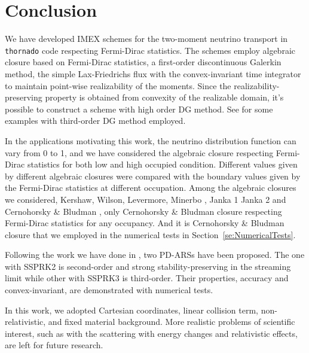 \section{Conclusion}\label{se:Conclusion}

We have developed IMEX schemes for the two-moment neutrino transport in \texttt{thornado} code respecting Fermi-Dirac statistics.
The schemes employ algebraic closure based on Fermi-Dirac statistics, a first-order discontinuous Galerkin method, the simple Lax-Friedrichs flux with the convex-invariant time integrator to maintain point-wise realizability of the moments.
Since the realizability-preserving property is obtained from convexity of the realizable domain, it's possible to construct a scheme with high order DG method.
See \cite{chu_etal_2018} for some examples with third-order DG method employed.

In the applications motivating this work, the neutrino distribution function can vary from 0 to 1, and we have considered the algebraic closure respecting Fermi-Dirac statistics for both low and high occupied condition.
Different values given by different algebraic closures were compared with the boundary values given by the Fermi-Dirac statistics at different occupation.
Among the algebraic closures we considered, Kershaw\cite{kershaw_1976}, Wilson\cite{wilson_1975,leblanc_1970}, Levermore\cite{levermore_1984}, Minerbo \cite{minerbo_1978}, Janka 1\cite{janka_1991} Janka 2\cite{janka_1992} and Cernohorsky \& Bludman \cite{cernohorskyBludman_1994}, only Cernohorsky \& Bludman closure respecting Fermi-Dirac statistics for any occupancy.
And it is Cernohorsky \& Bludman closure that we employed in the numerical tests in Section~\ref{se:NumericalTests}.

Following the work we have done in \cite{chu_etal_2018}, two PD-ARSs have been proposed.
The one with SSPRK2 is second-order and strong stability-preserving in the streaming limit while other with SSPRK3 is third-order.
Their properties, accuracy and convex-invariant, are demonstrated with numerical tests.

In this work, we adopted Cartesian coordinates, linear collision term, non-relativistic, and fixed material background.
More realistic problems of scientific interest, such as with the scattering with energy changes and relativistic effects, are left for future research.